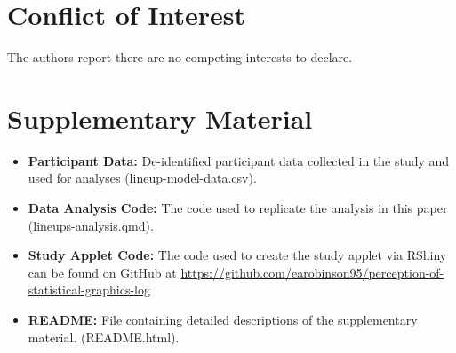 \documentclass[12pt]{article}
\providecommand{\tightlist}{%
  \setlength{\itemsep}{0pt}\setlength{\parskip}{0pt}}
\begin{document}
\section*{Conflict of Interest}\label{conflict-of-interest}

The authors report there are no competing interests to declare.

\section*{Supplementary Material}\label{supplementary-material}

\begin{itemize}
\tightlist
\item
  \textbf{Participant Data:} De-identified participant data collected in
  the study and used for analyses (lineup-model-data.csv).
\item
  \textbf{Data Analysis Code:} The code used to replicate the analysis
  in this paper (lineups-analysis.qmd).
\item
  \textbf{Study Applet Code:} The code used to create the study applet
  via RShiny can be found on GitHub at
  \url{https://github.com/earobinson95/perception-of-statistical-graphics-log}
\item
  \textbf{README:} File containing detailed descriptions of the
  supplementary material. (README.html).
\end{itemize}


\renewcommand\refname{References}

\end{document}
